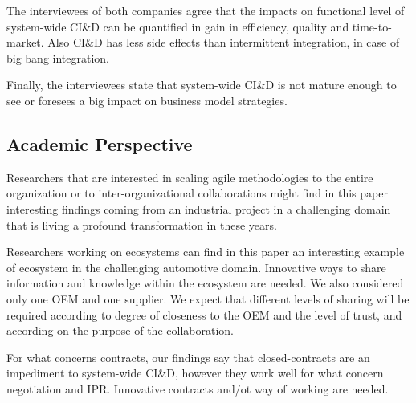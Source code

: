 The interviewees of both companies agree that the impacts on functional level of system-wide CI\&D %
can be quantified in gain in efficiency, quality and time-to-market. Also CI\&D has less side effects than intermittent integration, in case of big bang integration.  

Finally, the interviewees state that system-wide CI\&D is not mature enough to see or foresees a big impact on business model strategies. 

\subsection{Academic Perspective}

Researchers that are interested in scaling agile methodologies to the entire organization or to inter-organizational collaborations might find in this paper interesting findings coming from an industrial project in a challenging domain that is living a profound transformation in these years. 

Researchers working on ecosystems can find in this paper an interesting example of ecosystem in the challenging automotive domain. Innovative ways to share information and knowledge within the ecosystem are needed. We also considered only one OEM and one supplier. We expect that different levels of sharing will be required according to degree of closeness to the OEM and the level of trust, and according on the purpose of the collaboration.

For what concerns contracts, our findings say that closed-contracts are an impediment to system-wide CI\&D, however they work well for what concern negotiation and IPR. Innovative contracts and/ot way of working are needed.

% 
